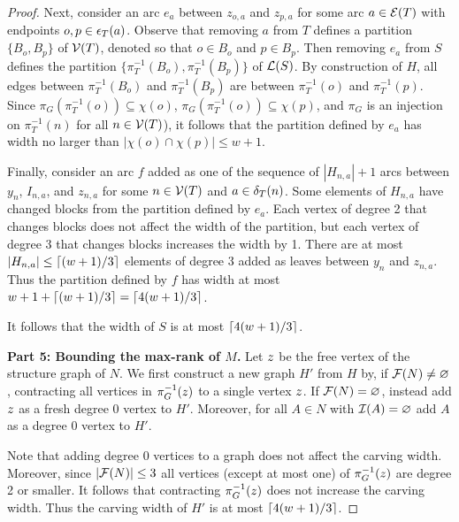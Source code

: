 \begin{proof}
Next, consider an arc $e_a$ between $z_{o,a}$ and $z_{p,a}$ for some arc $a \in \mathcal{E}(T)$ with endpoints $o, p \in \epsilon_{T}(a)$.
Observe that removing $a$ from $T$ defines a partition $\{B_o, B_p\}$ of $\mathcal{V}(T)$, denoted so that $o \in B_o$ and $p \in B_p$. Then removing $e_a$ from $S$ defines the partition $\{ \pi_T^{-1}(B_o), \pi_T^{-1}(B_p) \}$ of $\mathcal{L}(S)$. By construction of $H$, all edges between $\pi_T^{-1}(B_o)$ and $\pi_T^{-1}(B_p)$ are between $\pi_T^{-1}(o)$ and $\pi_T^{-1}(p)$. Since $\pi_G(\pi_T^{-1}(o)) \subseteq \chi(o)$, $\pi_G(\pi_T^{-1}(o)) \subseteq \chi(p)$, and $\pi_G$ is an injection on $\pi_T^{-1}(n)$ for all $n \in \mathcal{V}(T)$), it follows that the partition defined by $e_a$ has width no larger than $|\chi(o) \cap \chi(p)| \leq w+1$. 

Finally, consider an arc $f$ added as one of the sequence of $|H_{n,a}|+1$ arcs between $y_n$, $I_{n,a}$, and $z_{n,a}$ for some $n \in \mathcal{V}(T)$ and $a \in \delta_{T}(n)$. Some elements of $H_{n,a}$ have changed blocks from the partition defined by $e_a$. Each vertex of degree 2 that changes blocks does not affect the width of the partition, but each vertex of degree 3 that changes blocks increases the width by 1. There are at most $|H_{n,a}| \leq \lceil(w+1)/3\rceil$ elements of degree 3 added as leaves between $y_n$ and $z_{n,a}$. Thus the partition defined by $f$ has width at most $w + 1 + \lceil(w+1)/3\rceil = \lceil4(w+1)/3\rceil$.

It follows that the width of $S$ is at most $\lceil4(w+1)/3\rceil$.

\textbf{Part 5: Bounding the max-rank of $M$.} Let $z$ be the free vertex of the structure graph of $N$. We first construct a new graph $H'$ from $H$ by, if $\mathcal{F}(N) \neq \varnothing$, contracting all vertices in $\pi_G^{-1}(z)$ to a single vertex $z$. If $\mathcal{F}(N) = \varnothing$, instead add $z$ as a fresh degree 0 vertex to $H'$. Moreover, for all $A \in N$ with $\mathcal{I}(A) = \varnothing$ add $A$ as a degree 0 vertex to $H'$. 

Note that adding degree 0 vertices to a graph does not affect the carving width. Moreover, since $|\mathcal{F}(N)| \leq 3$ all vertices (except at most one) of $\pi_G^{-1}(z)$ are degree 2 or smaller. It follows that contracting $\pi_G^{-1}(z)$ does not increase the carving width. Thus the carving width of $H'$ is at most $\lceil4(w+1)/3\rceil$.


\end{proof}
